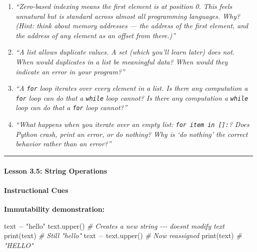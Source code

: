 \documentclass[
  justified,
  openright,
]{tufte-book}
\let\subsection\paragraph
\let\paragraph\paragraph
\newcommand{\StringTok}[1]{\textcolor{CodeString}{#1}}              %
\newcommand{\CommentTok}[1]{\textcolor{CodeComment}{\textit{#1}}}  %
\newcommand{\OperatorTok}[1]{\textcolor{DarkGray}{#1}}              %
\newenvironment{Shaded}{%
  \begin{mdframed}[style=TufteCode]%
}{%
  \end{mdframed}%
}
\let\subsection\paragraph
\let\paragraph\paragraph
\begin{document}
\begin{enumerate}
\def\labelenumi{\arabic{enumi}.}
\item
  \emph{``Zero-based indexing means the first element is at position 0.
  This feels unnatural but is standard across almost all programming
  languages. Why? (Hint: think about memory addresses --- the address of
  the first element, and the address of any element as an offset from
  there.)''}
\item
  \emph{``A list allows duplicate values. A set (which you'll learn
  later) does not. When would duplicates in a list be meaningful data?
  When would they indicate an error in your program?''}
\item
  \emph{``A \texttt{for} loop iterates over every element in a list. Is
  there any computation a \texttt{for} loop can do that a \texttt{while}
  loop cannot? Is there any computation a \texttt{while} loop can do
  that a \texttt{for} loop cannot?''}
\item
  \emph{``What happens when you iterate over an empty list:
  \texttt{for\ item\ in\ {[}{]}:}? Does Python crash, print an error, or
  do nothing? Why is `do nothing' the correct behavior rather than an
  error?''}
\end{enumerate}

\begin{center}\rule{0.5\linewidth}{0.5pt}\end{center}

\subsection{Lesson 3.5: String
Operations}\label{lesson-3.5-string-operations}

\paragraph{Instructional Cues}\label{instructional-cues-9}

\textbf{Immutability demonstration:}

\begin{Shaded}
\begin{Highlighting}[]
text \OperatorTok{=} \StringTok{"hello"}
text.upper()        \CommentTok{\# Creates a new string {-}{-}{-} doesn\textquotesingle{}t modify text}
print(text)         \CommentTok{\# Still "hello"}
text \OperatorTok{=} text.upper() \CommentTok{\# Now reassigned}
print(text)         \CommentTok{\# "HELLO"}
\end{Highlighting}
\end{Shaded}
\end{document}
